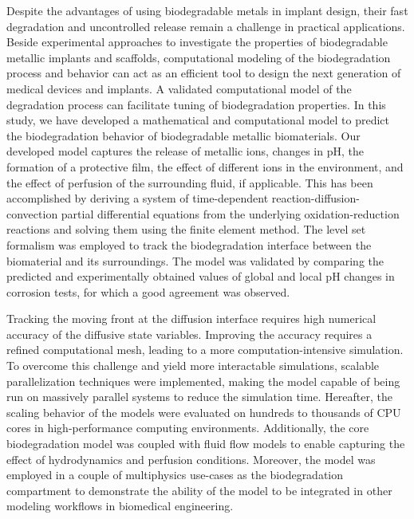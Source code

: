 Despite the advantages of using biodegradable metals in implant design, their fast degradation and uncontrolled release remain a challenge in practical applications. Beside experimental approaches to investigate the properties of biodegradable metallic implants and scaffolds, computational modeling of the biodegradation process and behavior can act as an efficient tool to design the next generation of medical devices and implants. A validated computational model of the degradation process can facilitate tuning of biodegradation properties. In this study, we have developed a mathematical and computational model to predict the biodegradation behavior of biodegradable metallic biomaterials. Our developed model captures the release of metallic ions, changes in pH, the formation of a protective film, the effect of different ions in the environment, and the effect of perfusion of the surrounding fluid, if applicable. This has been accomplished by deriving a system of time-dependent reaction-diffusion-convection partial differential equations from the underlying oxidation-reduction reactions and solving them using the finite element method. The level set formalism was employed to track the biodegradation interface between the biomaterial and its surroundings. The model was validated by comparing the predicted and experimentally obtained values of global and local pH changes in corrosion tests, for which a good agreement was observed.

Tracking the moving front at the diffusion interface requires high numerical accuracy of the diffusive state variables. Improving the accuracy requires a refined computational mesh, leading to a more computation-intensive simulation. To overcome this challenge and yield more interactable simulations, scalable parallelization techniques were implemented, making the model capable of being run on massively parallel systems to reduce the simulation time. Hereafter, the scaling behavior of the models were evaluated on hundreds to thousands of CPU cores in high-performance computing environments. 
Additionally, the core biodegradation model was coupled with fluid flow models to enable capturing the effect of hydrodynamics and perfusion conditions. Moreover, the model was employed in a couple of multiphysics use-cases as the biodegradation compartment to demonstrate the ability of the model to be integrated in other modeling workflows in biomedical engineering.

\cleardoublepage

